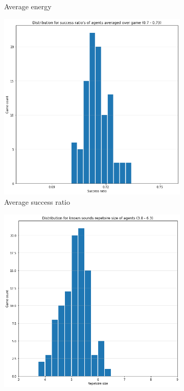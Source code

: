 \begin{figure}[ht]
\begin{subfigure}{.30\textwidth}
        \captionsetup{width=0.9\linewidth}
        \captionsetup{justification=centering}
        \caption{Average energy}
    \end{subfigure}
    \begin{subfigure}{.30\textwidth}
        \centering
        \includegraphics[width=\textwidth]{images/results/regular_success.png}
        \captionsetup{width=0.9\linewidth}
        \captionsetup{justification=centering}
        \caption{Average success ratio}
    \end{subfigure}
    \hspace{0.5cm}
    \begin{subfigure}{.30\textwidth}
        \centering
        \includegraphics[width=\textwidth]{images/results/regular_size.png}

\end{subfigure}
\end{figure}
